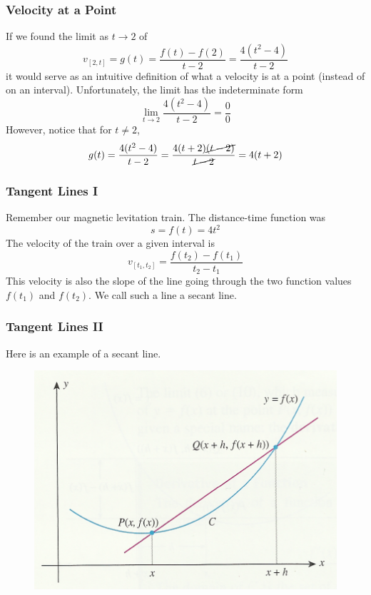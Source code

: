 \documentclass[xcolor=dvipsnames]{beamer}
\begin{document}
\begin{frame}
  \frametitle{Velocity at a Point}
If we found the limit as $t\rightarrow{}2$ of
\begin{displaymath}
  v_{[2,t]}=g(t)=\frac{f(t)-f(2)}{t-2}=\frac{4(t^{2}-4)}{t-2}
\end{displaymath}
it would serve as an intuitive definition of what a velocity is at a
point (instead of on an interval). Unfortunately, the limit has the
\alert{indeterminate form}
\begin{equation}
  \label{eq:toochoir}
  \lim_{t\rightarrow{}2}\frac{4(t^{2}-4)}{t-2}=\frac{0}{0}
\end{equation}
However, notice that for $t\neq{}2$,
\begin{equation}
  \label{eq:geeshaiz}
  g(t)=\frac{4(t^{2}-4)}{t-2}=\frac{4(t+2)\cancel{(t-2)}}{\cancel{t-2}}=4(t+2)
\end{equation}
\end{frame}

\begin{frame}
  \frametitle{Tangent Lines I}
Remember our magnetic levitation train. The distance-time function was
\begin{equation}
  \label{eq:leezaach}
  s=f(t)=4t^{2}
\end{equation}
The velocity of the train over a given interval is
\begin{equation}
  \label{eq:ohgheith}
  v_{[t_{1},t_{2}]}=\frac{f(t_{2})-f(t_{1})}{t_{2}-t_{1}}
\end{equation}
This velocity is also the slope of the line going through the two
function values $f(t_{1})$ and $f(t_{2})$. We call such a line a
\alert{secant line}. 
\end{frame}

\begin{frame}
  \frametitle{Tangent Lines II}
Here is an example of a secant line.
  \begin{figure}[h]
    \includegraphics[scale=.7]{./diagrams/tangent2.png}
  \end{figure}
\end{frame}
\end{document}
